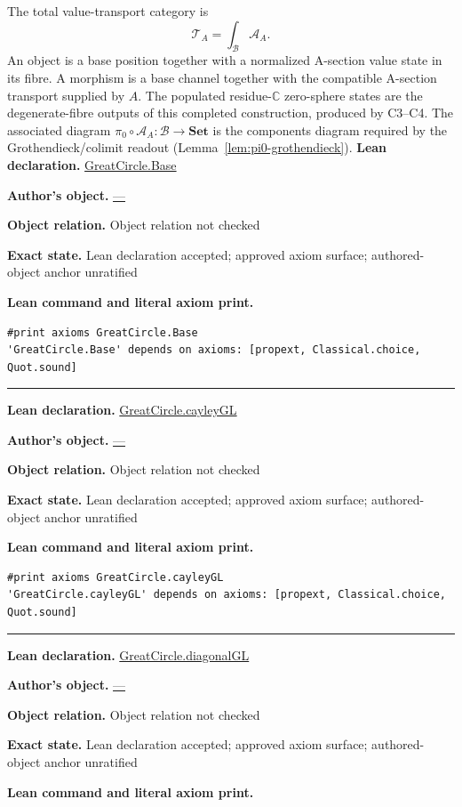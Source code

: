 \documentclass[11pt]{article}
\newcommand{\CC}{\mathbb{C}}
\theoremstyle{plain}
\theoremstyle{definition}
\theoremstyle{remark}
\begin{document}
\begin{tcolorbox}
The total value-transport category is
\[
  \mathcal T_A=\int_{\mathcal B}\mathcal A_A.
\]
An object is a base position together with a normalized A-section value state in its fibre. A
morphism is a base channel together with the compatible A-section transport supplied by $A$.
The populated residue-$\CC$ zero-sphere states are the degenerate-fibre outputs of this
completed construction, produced by \textup{C3--C4}. The associated diagram
$\pi_0\circ\mathcal A_A:\mathcal B\to\mathbf{Set}$ is the components diagram required by the
Grothendieck/colimit readout (Lemma~\ref{lem:pi0-grothendieck}).
\tcblower
\textbf{Lean declaration.} \url{GreatCircle.Base}
\par\textbf{Author's object.} \url{—}
\par\textbf{Object relation.} Object relation not checked
\par\textbf{Exact state.} Lean declaration accepted; approved axiom surface; authored-object anchor unratified
\par\smallskip\textbf{Lean command and literal axiom print.}
\begin{Verbatim}[breaklines=true,breakanywhere=true,fontsize=\small]
#print axioms GreatCircle.Base
'GreatCircle.Base' depends on axioms: [propext, Classical.choice, Quot.sound]
\end{Verbatim}
\medskip\hrule\medskip
\textbf{Lean declaration.} \url{GreatCircle.cayleyGL}
\par\textbf{Author's object.} \url{—}
\par\textbf{Object relation.} Object relation not checked
\par\textbf{Exact state.} Lean declaration accepted; approved axiom surface; authored-object anchor unratified
\par\smallskip\textbf{Lean command and literal axiom print.}
\begin{Verbatim}[breaklines=true,breakanywhere=true,fontsize=\small]
#print axioms GreatCircle.cayleyGL
'GreatCircle.cayleyGL' depends on axioms: [propext, Classical.choice, Quot.sound]
\end{Verbatim}
\medskip\hrule\medskip
\textbf{Lean declaration.} \url{GreatCircle.diagonalGL}
\par\textbf{Author's object.} \url{—}
\par\textbf{Object relation.} Object relation not checked
\par\textbf{Exact state.} Lean declaration accepted; approved axiom surface; authored-object anchor unratified
\par\smallskip\textbf{Lean command and literal axiom print.}

\end{tcolorbox}
\end{document}
